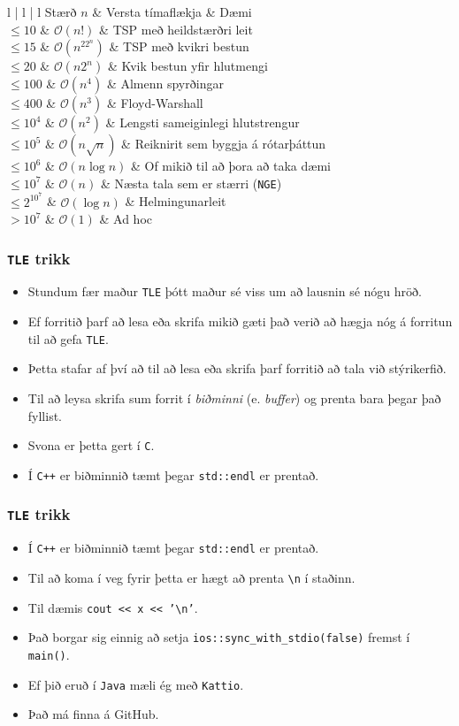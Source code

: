 \documentclass{beamer}
\newcommand\env[2]
{
	\begin{#1}
	#2
	\end{#1}
}
\begin{document}
\env{frame}
{
	\env{tabular}
	{
		{l | l | l}
		Stærð $n$ & Versta tímaflækja & Dæmi\\
		\hline
		$\leq 10$ & $\mathcal{O}(n!)$ & TSP með heildstærðri leit\\
		$\leq 15$ & $\mathcal{O}(n^22^n)$ & TSP með kvikri bestun\\
		$\leq 20$ & $\mathcal{O}(n2^n)$ & Kvik bestun yfir hlutmengi\\
		$\leq 100$ & $\mathcal{O}(n^4)$ & Almenn spyrðingar\\
		$\leq 400$ & $\mathcal{O}(n^3)$ & Floyd-Warshall\\
		$\leq 10^4$ & $\mathcal{O}(n^2)$ & Lengsti sameiginlegi hlutstrengur\\
		$\leq 10^5$ & $\mathcal{O}(n \sqrt{n})$ & Reiknirit sem byggja á rótarþáttun\\
		$\leq 10^6$ & $\mathcal{O}(n \log n)$ & Of mikið til að þora að taka dæmi\\
		$\leq 10^7$ & $\mathcal{O}(n)$ & Næsta tala sem er stærri (\texttt{NGE})\\
		$\leq 2^{10^7}$ & $\mathcal{O}(\log n)$ & Helmingunarleit\\
		$> 10^7$ & $\mathcal{O}(1)$ & Ad hoc
	}
}

\env{frame}
{
	\frametitle{\texttt{TLE} trikk}
	\env{itemize}
	{
		\item<1-> Stundum fær maður \texttt{TLE} þótt maður sé viss um að lausnin sé nógu hröð.
		\item<2-> Ef forritið þarf að lesa eða skrifa mikið gæti það verið að hægja nóg á forritun til að gefa \texttt{TLE}.
		\item<3-> Þetta stafar af því að til að lesa eða skrifa þarf forritið að tala við stýrikerfið.
		\item<4-> Til að leysa skrifa sum forrit í \emph{biðminni} (e. \emph{buffer}) og prenta bara þegar það fyllist.
		\item<5-> Svona er þetta gert í \texttt{C}.
		\item<6-> Í \texttt{C++} er biðminnið tæmt þegar \texttt{std::endl} er prentað.
	}
}

\env{frame}
{
	\frametitle{\texttt{TLE} trikk}
	\env{itemize}
	{
		\item<1-> Í \texttt{C++} er biðminnið tæmt þegar \texttt{std::endl} er prentað.
		\item<2-> Til að koma í veg fyrir þetta er hægt að prenta \texttt{\textbackslash n} í staðinn.
		\item<3-> Til dæmis \texttt{cout << x << '\textbackslash n'}.
		\item<4-> Það borgar sig einnig að setja \texttt{ios::sync\_with\_stdio(false)} fremst í \texttt{main()}.
		\item<5-> Ef þið eruð í \texttt{Java} mæli ég með \texttt{Kattio}.
		\item<6-> Það má finna á GitHub.
	}
}
\end{document}
